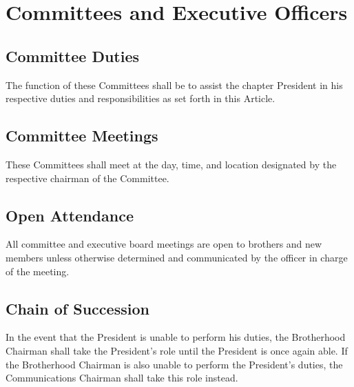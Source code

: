 \chapter{Committees and Executive Officers}
\label{sec:committees-and-executive-officers}

\section{Committee Duties}

The function of these Committees shall be to assist the chapter President in
his respective duties and responsibilities as set forth in this Article.

\section{Committee Meetings }

These Committees shall meet at the day, time, and location designated by the
respective chairman of the Committee.

\section{Open Attendance}

All committee and executive board meetings are open to brothers and new members
unless otherwise determined and communicated by the officer in charge of the
meeting.

\section{Chain of Succession}

In the event that the President is unable to perform his duties, the
Brotherhood Chairman shall take the President’s role until the President is
once again able.
If the Brotherhood Chairman is also unable to perform the President’s duties,
the Communications Chairman shall take this role instead.

